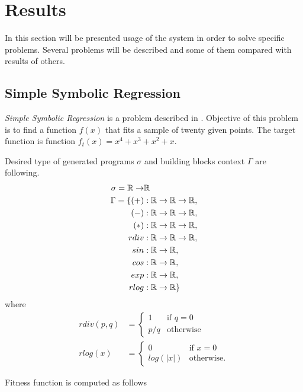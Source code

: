 \documentclass[12pt,a4paper]{report}
\begin{document}
\chapter{Results}
	In this section will be presented usage of the system in order to solve specific problems. Several problems will be described and some of them compared with results
of others. 

\section{Simple Symbolic Regression}

\textit{Simple Symbolic Regression} is a problem described
in \cite{koza92}. Objective of this problem is to 
find a function $f(x)$ that fits a sample
of twenty given points. The target function is 
function $f_{t}(x) = x^4 + x^3 + x^2 + x$.  

Desired type of generated programs $\sigma$ and 
building blocks context $\Gamma$ are following.
\newcommand{\Real}{\mathbb{R}}
\begin{align*}
\sigma = \Real \ar &\Real\\
\Gamma = \{
  (+)  &: \Real \ar \Real \ar \Real    ,\\
  (-)  &: \Real \ar \Real \ar \Real    ,\\
  (*)  &: \Real \ar \Real \ar \Real    ,\\
  rdiv &: \Real \ar \Real \ar \Real    ,\\
  sin  &: \Real \ar \Real              ,\\
  cos  &: \Real \ar \Real              ,\\
  exp  &: \Real \ar \Real              ,\\ 
  rlog &: \Real \ar \Real              \}\\
\end{align*}
where
\begin{align*}
rdiv(p,q) &= \begin{cases} 1 &\mbox{if } q = 0 \\
p/q & \mbox{otherwise } \end{cases}  \\
rlog(x) &= \begin{cases} 0 &\mbox{if } x = 0 \\
log(\vert x\vert) & \mbox{otherwise}. \end{cases}
\end{align*}

Fitness function is computed as follows
\end{document}
